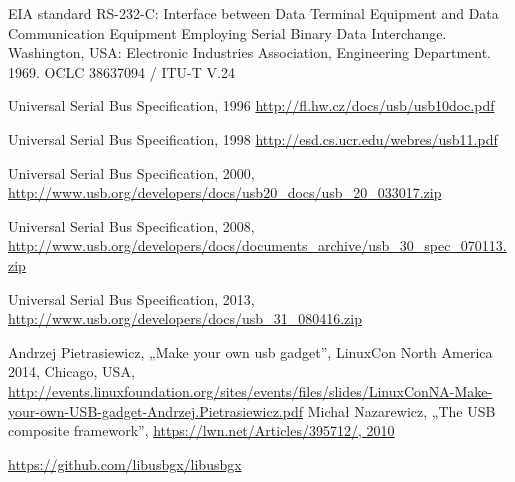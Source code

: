 \documentclass[10pt, a5paper]{article}
\begin{document}
\begin{thebibliography}{99}

 EIA standard RS-232-C: Interface between Data Terminal Equipment and Data Communication Equipment Employing Serial Binary Data Interchange. Washington, USA: Electronic Industries Association, Engineering Department. 1969. OCLC 38637094 / ITU-T V.24

 Universal Serial Bus Specification, 1996 \url{http://fl.hw.cz/docs/usb/usb10doc.pdf}

 Universal Serial Bus Specification, 1998 \url{ http://esd.cs.ucr.edu/webres/usb11.pdf}

 Universal Serial Bus Specification, 2000,\url{ http://www.usb.org/developers/docs/usb20\_docs/usb\_20\_033017.zip}

 Universal Serial Bus Specification, 2008,\url{ http://www.usb.org/developers/docs/documents\_archive/usb\_30\_spec\_070113.zip}

 Universal Serial Bus Specification, 2013,\url{ http://www.usb.org/developers/docs/usb\_31\_080416.zip}

 Andrzej Pietrasiewicz, „Make your own usb gadget”, LinuxCon North America 2014, Chicago, USA,\url{ http://events.linuxfoundation.org/sites/events/files/slides/LinuxConNA-Make-your-own-USB-gadget-Andrzej.Pietrasiewicz.pdf}
 Michał Nazarewicz, „The USB composite framework”, 
\url{https://lwn.net/Articles/395712/, 2010}

 \url{https://github.com/libusbgx/libusbgx}
\end{thebibliography}
\end{document}
